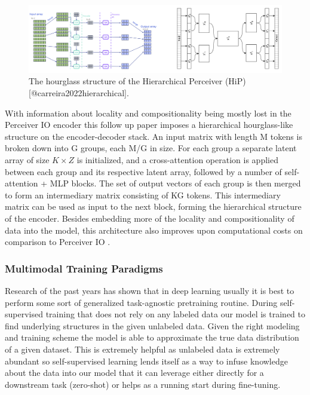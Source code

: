 \documentclass[
]{krantz}
\begin{document}
\begin{figure}

{\centering \includegraphics[width=1\linewidth]{figures/03-01/hierarchical-perceiver} 

}

\caption{The hourglass structure of the Hierarchical Perceiver (HiP)[@carreira2022hierarchical].}\label{fig:hierarchical-perceiver}
\end{figure}

With information about locality and compositionality being mostly lost in the Perceiver IO encoder this follow up paper imposes a hierarchical hourglass-like structure on the encoder-decoder stack. An input matrix with length M tokens is broken down into G groups, each M/G in size. For each group a separate latent array of size \(K \times Z\) is initialized, and a cross-attention operation is applied between each group and its respective latent array, followed by a number of self-attention + MLP blocks. The set of output vectors of each group is then merged to form an intermediary matrix consisting of KG tokens. This intermediary matrix can be used as input to the next block, forming the hierarchical structure of the encoder. Besides embedding more of the locality and compositionality of data into the model, this architecture also improves upon computational costs on comparison to Perceiver IO \citep{carreira2022hierarchical}.

\hypertarget{multimodal-training-paradigms}{%
\subsubsection{Multimodal Training Paradigms}\label{multimodal-training-paradigms}}

Research of the past years has shown that in deep learning usually it is best to perform some sort of generalized task-agnostic pretraining routine. During self-supervised training that does not rely on any labeled data our model is trained to find underlying structures in the given unlabeled data. Given the right modeling and training scheme the model is able to approximate the true data distribution of a given dataset. This is extremely helpful as unlabeled data is extremely abundant so self-supervised learning lends itself as a way to infuse knowledge about the data into our model that it can leverage either directly for a downstream task (zero-shot) or helps as a running start during fine-tuning.
\end{document}
